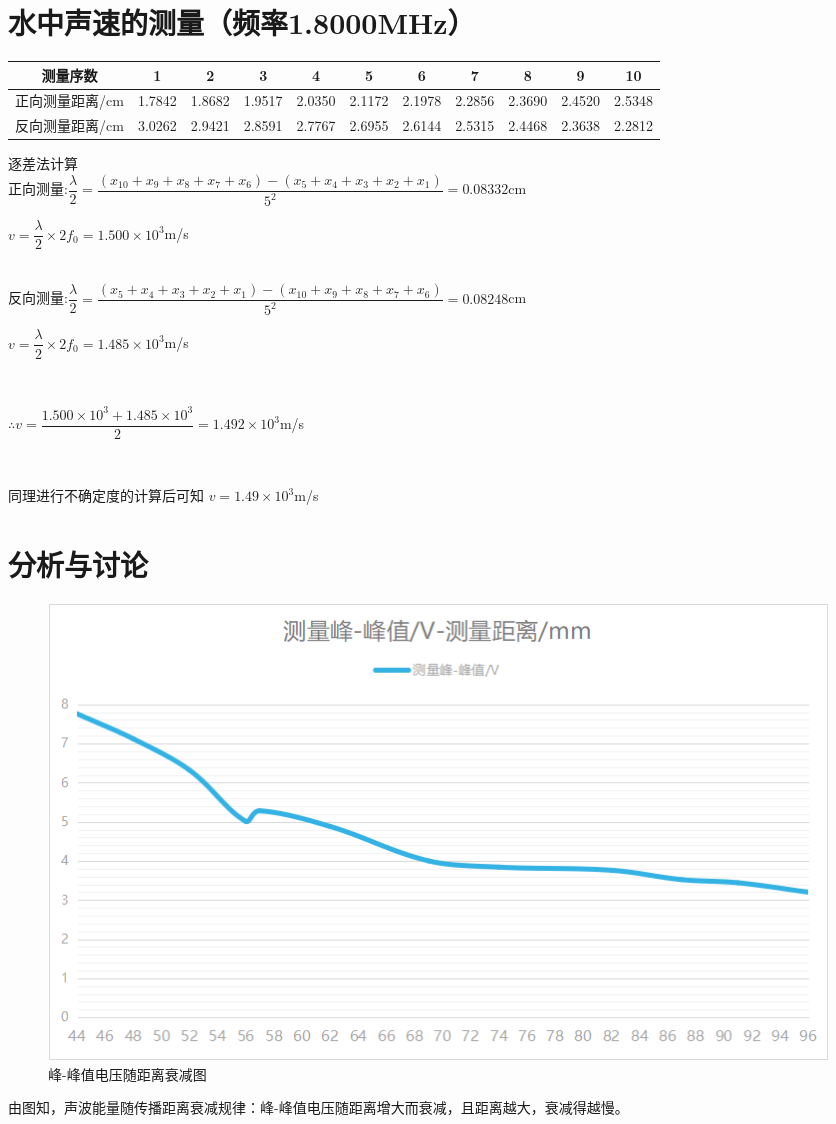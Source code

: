 \documentclass[1pt]{article}
\begin{document}
\section{水中声速的测量（频率1.8000MHz）}
	\begin{center}
	\begin{tabular}{|c|c|c|c|c|c|c|c|c|c|c|}
	\hline
	测量序数&1&2&3&4&5&6&7&8&9&10\\
	\hline
	正向测量距离/cm&1.7842&1.8682&1.9517&2.0350&2.1172&2.1978&2.2856&2.3690&2.4520&2.5348\\
	\hline
	反向测量距离/cm&3.0262&2.9421&2.8591&2.7767&2.6955&2.6144&2.5315&2.4468&2.3638&2.2812\\
	\hline
	\end{tabular}
	\end{center}
逐差法计算\\
正向测量:\qquad$\dfrac{\lambda}{2}=\dfrac{(x_{10}+x_9+x_8+x_7+x_6)-(x_5+x_4+x_3+x_2+x_1)}{5^2}=0.08332$cm\\
 \centerline{$v=\dfrac{\lambda}{2}\times2f_0=1.500\times10^3$m/s}\\
反向测量:\qquad$\dfrac{\lambda}{2}=\dfrac{(x_5+x_4+x_3+x_2+x_1)-(x_{10}+x_9+x_8+x_7+x_6)}{5^2}=0.08248$cm\\
\centerline{$v=\dfrac{\lambda}{2}\times2f_0=1.485\times10^3$m/s}\\
\centerline{$\therefore v=\dfrac{1.500\times10^3+1.485\times10^3}{2}=1.492\times10^3$m/s}\\
\centerline{同理进行不确定度的计算后可知 $v=1.49\times 10^3$m/s}

\section{分析与讨论}
	\begin{figure}[htbp]
	\centering
	\includegraphics[scale=0.8]{diminishing.png}
	\caption{峰-峰值电压随距离衰减图}
\end{figure}
由图知，声波能量随传播距离衰减规律：峰-峰值电压随距离增大而衰减，且距离越大，衰减得越慢。
\end{document}
